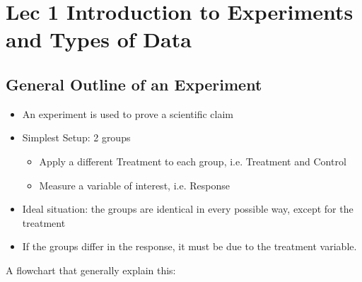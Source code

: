 \documentclass[a4paper,11pt]{article}
\begin{document}
\tableofcontents

\newpage

\section{Lec 1 Introduction to Experiments and Types of Data}
\subsection{General Outline of an Experiment}
\begin{itemize}
\item An experiment is used to prove a scientific claim
\item Simplest Setup: 2 groups
\begin{itemize}
\item Apply a different Treatment to each group, i.e. Treatment and Control
\item Measure a variable of interest, i.e. Response
\end{itemize}
\item Ideal situation: the groups are identical in every possible way, except for the treatment
\item If the groups differ in the response, it must be due to the treatment variable. 
\end{itemize}
A flowchart that generally explain this: 

\end{document}
